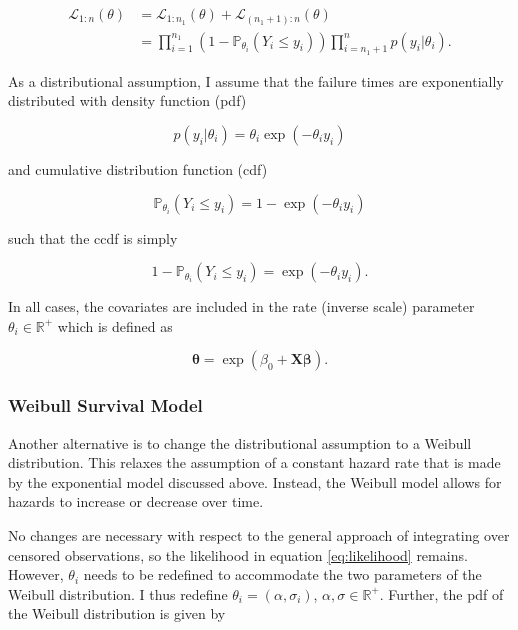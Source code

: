 \documentclass[11pt]{article}
\begin{document}
\begin{align}
    \mathcal{L}_{1:n}(\theta) &= \mathcal{L}_{1:n_1}(\theta) + \mathcal{L}_{(n_1 + 1):n}(\theta) \nonumber \\
    &= \prod_{i = 1}^{n_1} (1-\mathbb{P}_{\theta_i}(Y_i \leq y_i)) \prod_{i = n_1 + 1}^n p(y_i|\theta_i).
    \label{eq:likelihood}
\end{align}

As a distributional assumption, I assume that the failure times are exponentially distributed with density function (pdf)

\begin{equation*}
    p(y_i|\theta_i) = \theta_i \exp(-\theta_i y_i)
\end{equation*}

and cumulative distribution function (cdf) 

\begin{equation*}
    \mathbb{P}_{\theta_i}(Y_i \leq y_i) = 1 - \exp(-\theta_i y_i)
\end{equation*}

such that the ccdf is simply
    
\begin{equation*}
    1 - \mathbb{P}_{\theta_i}(Y_i \leq y_i) = \exp(-\theta_i y_i).
\end{equation*}
    
In all cases, the covariates are included in the rate (inverse scale) parameter $\theta_i \in \mathbb{R}^+$ which is defined as 

\begin{equation*}
    \bm{\theta} = \exp(\beta_0 + \bm{X}\bm{\beta}). 
\end{equation*}

\subsubsection{Weibull Survival Model}
Another alternative is to change the distributional assumption to a Weibull distribution. This relaxes the assumption of a constant hazard rate that is made by the exponential model discussed above. Instead, the Weibull model allows for hazards to increase or decrease over time. 

No changes are necessary with respect to the general approach of integrating over censored observations, so the likelihood in equation \ref{eq:likelihood} remains. However, $\theta_i$ needs to be redefined to accommodate the two parameters of the Weibull distribution. I thus redefine $\theta_i = (\alpha, \sigma_i)$, $\alpha, \sigma \in \mathbb{R}^+$. Further, the pdf of the Weibull distribution is given by 
\end{document}
